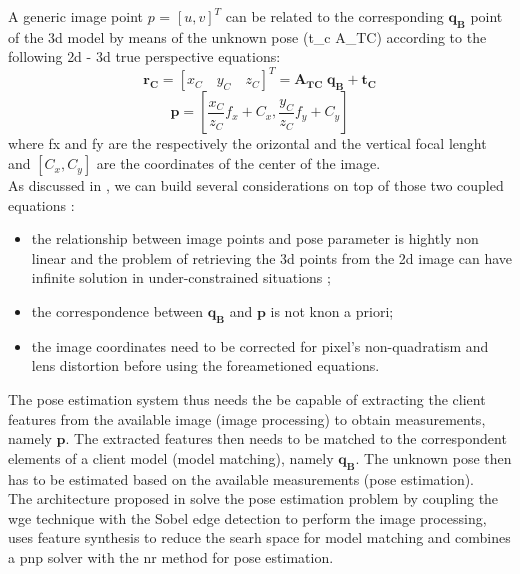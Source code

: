 A generic image point $p$ = $ [u,v]^T $ can be related to the corresponding $\mathbf{q_B}$ point of the \acrshort{3d} model by means of the unknown pose (\gls{t_c} \gls{A_TC}) according to the following \acrshort{2d} - \acrshort{3d} true perspective equations: 
\begin{equation}
 \mathbf{r_C} = \left[x_C \quad  y_C \quad z_C\right]^T = \mathbf{A_{TC}} \; \mathbf{q_B} + \mathbf{t_C}
\end{equation}
\begin{equation}
 \mathbf{p} = \left[ \frac{x_C}{z_C} f_x + C_x , \frac{y_C}{z_C} f_y + C_y \right]
\end{equation}
where \gls{fx} and \gls{fy} are the respectively the orizontal and the vertical focal lenght and $[C_x, C_y]$ are the coordinates of the center of the image.\\
As discussed in \cite{D2014}, we can build several considerations on top of those two coupled equations : 
\begin{itemize}
 \item the relationship between image points and pose parameter is hightly non linear and the problem of retrieving the \acrshort{3d} points from the \acrshort{2d} image can have infinite solution in under-constrained situations \cite{10.1145/358669.358692};
 \item the correspondence between $\mathbf{q_B}$ and $\mathbf{p}$ is not knon a priori;
 \item the image coordinates need to be corrected for pixel's non-quadratism and lens distortion before using the foreametioned equations.
\end{itemize}
The pose estimation system thus needs the be capable of extracting the client features from the available image (image processing) to obtain measurements, namely  $\mathbf{p}$. The extracted features then needs to be matched to the correspondent elements of a client model (model matching), namely $\mathbf{q_B}$. The unknown pose then has to be estimated based on the available measurements (pose estimation).\\
The architecture proposed in \cite{Sharma2018} solve the pose estimation problem by coupling the \acrfull{wge} technique with the Sobel edge detection to perform the image processing, uses feature synthesis to reduce the searh space for model matching and combines a \acrshort{pnp} solver with the \acrfull{nr} method for pose estimation.
